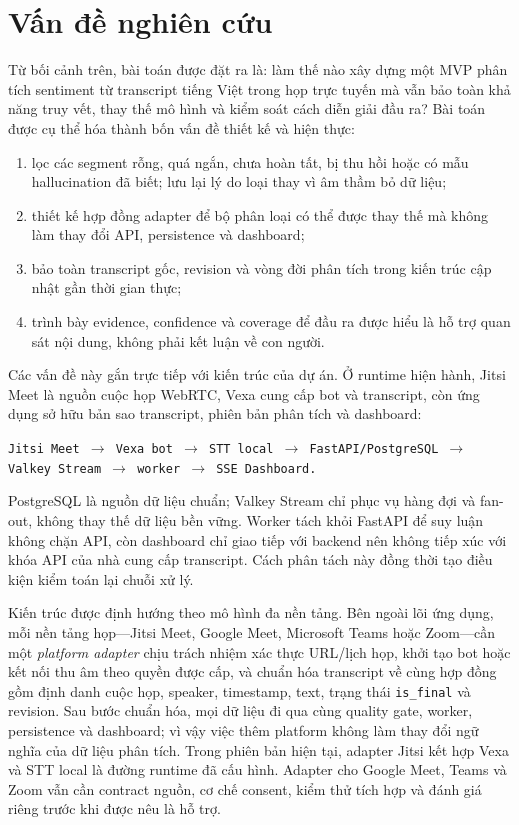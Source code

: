 \section{Vấn đề nghiên cứu}
Từ bối cảnh trên, bài toán được đặt ra là: làm thế nào xây dựng một MVP phân tích sentiment từ transcript tiếng Việt trong họp trực tuyến mà vẫn bảo toàn khả năng truy vết, thay thế mô hình và kiểm soát cách diễn giải đầu ra? Bài toán được cụ thể hóa thành bốn vấn đề thiết kế và hiện thực:
\begin{enumerate}[label=(\roman*)]
  \item lọc các segment rỗng, quá ngắn, chưa hoàn tất, bị thu hồi hoặc có mẫu hallucination đã biết; lưu lại lý do loại thay vì âm thầm bỏ dữ liệu;
  \item thiết kế hợp đồng adapter để bộ phân loại có thể được thay thế mà không làm thay đổi API, persistence và dashboard;
  \item bảo toàn transcript gốc, revision và vòng đời phân tích trong kiến trúc cập nhật gần thời gian thực;
  \item trình bày evidence, confidence và coverage để đầu ra được hiểu là hỗ trợ quan sát nội dung, không phải kết luận về con người.
\end{enumerate}

Các vấn đề này gắn trực tiếp với kiến trúc của dự án. Ở runtime hiện hành, Jitsi Meet là nguồn cuộc họp WebRTC, Vexa cung cấp bot và transcript, còn ứng dụng sở hữu bản sao transcript, phiên bản phân tích và dashboard:
\begin{center}
\texttt{Jitsi Meet $\rightarrow$ Vexa bot $\rightarrow$ STT local $\rightarrow$ FastAPI/PostgreSQL $\rightarrow$ Valkey Stream $\rightarrow$ worker $\rightarrow$ SSE Dashboard.}
\end{center}
PostgreSQL là nguồn dữ liệu chuẩn; Valkey Stream chỉ phục vụ hàng đợi và fan-out, không thay thế dữ liệu bền vững. Worker tách khỏi FastAPI để suy luận không chặn API, còn dashboard chỉ giao tiếp với backend nên không tiếp xúc với khóa API của nhà cung cấp transcript. Cách phân tách này đồng thời tạo điều kiện kiểm toán lại chuỗi xử lý.

Kiến trúc được định hướng theo mô hình đa nền tảng. Bên ngoài lõi ứng dụng, mỗi nền tảng họp---Jitsi Meet, Google Meet, Microsoft Teams hoặc Zoom---cần một \emph{platform adapter} chịu trách nhiệm xác thực URL/lịch họp, khởi tạo bot hoặc kết nối thu âm theo quyền được cấp, và chuẩn hóa transcript về cùng hợp đồng gồm định danh cuộc họp, speaker, timestamp, text, trạng thái \texttt{is\_final} và revision. Sau bước chuẩn hóa, mọi dữ liệu đi qua cùng quality gate, worker, persistence và dashboard; vì vậy việc thêm platform không làm thay đổi ngữ nghĩa của dữ liệu phân tích. Trong phiên bản hiện tại, adapter Jitsi kết hợp Vexa và STT local là đường runtime đã cấu hình. Adapter cho Google Meet, Teams và Zoom vẫn cần contract nguồn, cơ chế consent, kiểm thử tích hợp và đánh giá riêng trước khi được nêu là hỗ trợ.

